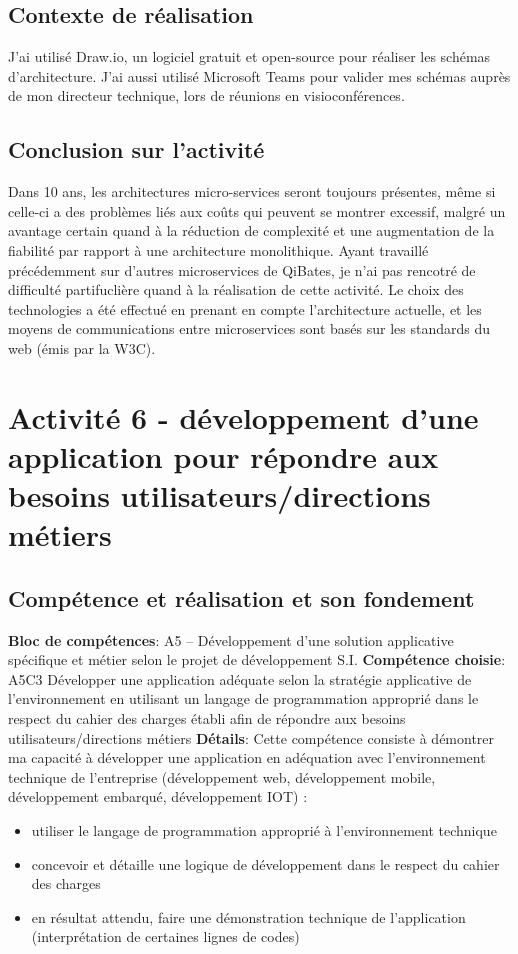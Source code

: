 \documentclass[a4paper, 11pt]{report}
\begin{document}
\subsection{Contexte de réalisation}
J'ai utilisé Draw.io, un logiciel gratuit et open-source pour réaliser les schémas d'architecture.
J'ai aussi utilisé Microsoft Teams pour valider mes schémas auprès de mon directeur technique, lors de réunions en visioconférences.
\subsection{Conclusion sur l'activité}
Dans 10 ans, les architectures micro-services seront toujours présentes, même si celle-ci a des problèmes liés aux coûts qui peuvent se montrer excessif, malgré un avantage certain quand à la réduction de complexité et une augmentation de la fiabilité par rapport à une architecture monolithique.
\newline
\newline
Ayant travaillé précédemment sur d'autres microservices de QiBates, je n'ai pas rencotré de difficulté partifuclière quand à la réalisation de cette activité.
Le choix des technologies a été effectué en prenant en compte l'architecture actuelle, et les moyens de communications entre microservices sont basés sur les standards du web (émis par la W3C).

\section{Activité 6 - développement d'une application pour répondre aux besoins utilisateurs/directions métiers}
\subsection{Compétence et réalisation et son fondement}
\textbf{Bloc de compétences}: A5 – Développement d’une solution applicative spécifique et métier selon le projet de développement S.I.
\newline
\textbf{Compétence choisie}: A5C3 Développer une application adéquate selon la stratégie applicative de l’environnement en utilisant un langage de programmation approprié dans le respect du cahier des charges établi afin de répondre aux besoins utilisateurs/directions métiers
\newline
\textbf{Détails}: Cette compétence consiste à démontrer ma capacité à développer une application en
adéquation avec l’environnement technique de l’entreprise (développement web, développement mobile, développement embarqué, développement IOT) :
\begin{itemize} 
 \item utiliser le langage de programmation approprié à l’environnement technique
 \item concevoir et détaille une logique de développement dans le respect du cahier des charges
 \item en résultat attendu, faire une démonstration technique de l'application (interprétation de certaines lignes de codes)
\end{itemize}
\end{document}
